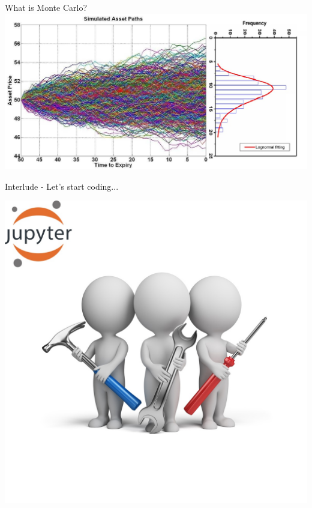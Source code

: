 \documentclass[11pt]{beamer}
\begin{document}
\begin{frame}{What is Monte Carlo?}
\includegraphics[scale = 0.4]{img/MonteCarloPathsMany.jpg}
\end{frame}
\begin{frame}{Interlude - Let's start coding...}
\begin{center}
\includegraphics[scale=.8]{img/exercise.jpg} 
\end{center}
\end{frame}
\end{document}
